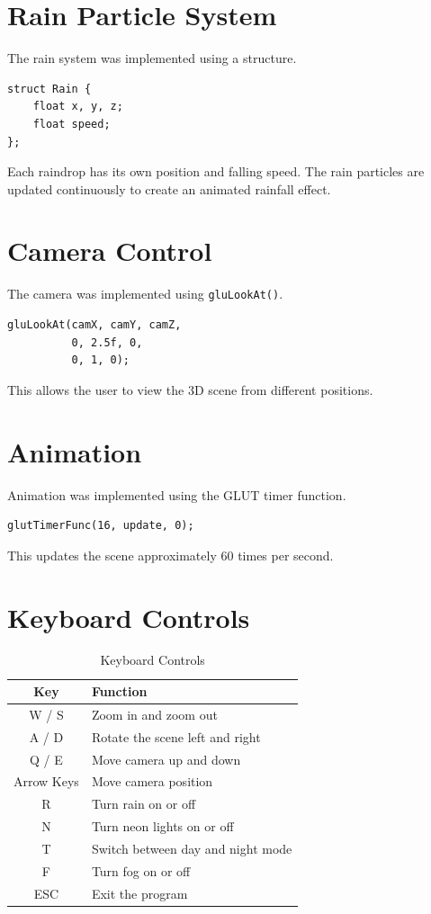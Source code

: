 \documentclass[12pt,a4paper]{report}
\begin{document}
\section{Rain Particle System}

The rain system was implemented using a structure.

\begin{lstlisting}
struct Rain {
    float x, y, z;
    float speed;
};
\end{lstlisting}

Each raindrop has its own position and falling speed. The rain particles are updated continuously to create an animated rainfall effect.

\section{Camera Control}

The camera was implemented using \texttt{gluLookAt()}.

\begin{lstlisting}
gluLookAt(camX, camY, camZ,
          0, 2.5f, 0,
          0, 1, 0);
\end{lstlisting}

This allows the user to view the 3D scene from different positions.

\section{Animation}

Animation was implemented using the GLUT timer function.

\begin{lstlisting}
glutTimerFunc(16, update, 0);
\end{lstlisting}

This updates the scene approximately 60 times per second.

\section{Keyboard Controls}

\begin{table}[H]
\centering
\renewcommand{\arraystretch}{1.3}
\begin{tabular}{|c|p{8cm}|}
\hline
\textbf{Key} & \textbf{Function} \\
\hline
W / S & Zoom in and zoom out \\
\hline
A / D & Rotate the scene left and right \\
\hline
Q / E & Move camera up and down \\
\hline
Arrow Keys & Move camera position \\
\hline
R & Turn rain on or off \\
\hline
N & Turn neon lights on or off \\
\hline
T & Switch between day and night mode \\
\hline
F & Turn fog on or off \\
\hline
ESC & Exit the program \\
\hline
\end{tabular}
\caption{Keyboard Controls}
\end{table}
\end{document}
